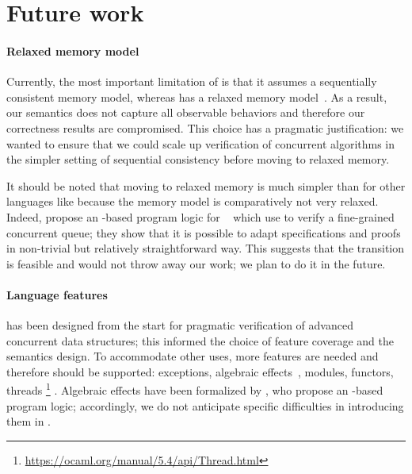 \section{Future work}

\paragraph{Relaxed memory model}

Currently, the most important limitation of \ZooLang is that it assumes a sequentially consistent memory model, whereas \OCamlFive has a relaxed memory model~\citep*{DBLP:conf/pldi/DolanSM18}.
As a result, our semantics does not capture all observable behaviors and therefore our correctness results are compromised.
This choice has a pragmatic justification: we wanted to ensure that we could scale up verification of concurrent algorithms in the simpler setting of sequential consistency before moving to relaxed memory.

It should be noted that moving to relaxed memory is much simpler than for other languages like \C because the \OCamlFive memory model is comparatively not very relaxed.
Indeed, \citet*{DBLP:journals/pacmpl/MevelJP20} propose an \Iris-based program logic for \MulticoreOCaml~\citep*{DBLP:journals/pacmpl/Sivaramakrishnan20} which \citet*{DBLP:journals/pacmpl/MevelJ21} use to verify a fine-grained concurrent queue; they show that it is possible to adapt specifications and proofs in non-trivial but relatively straightforward way.
This suggests that the transition is feasible and would not throw away our work; we plan to do it in the future.

\paragraph{Language features}

\ZooLang has been designed from the start for pragmatic verification of advanced concurrent data structures; this informed the choice of feature coverage and the semantics design.
To accommodate other uses, more features are needed and therefore should be supported: exceptions, algebraic effects~\citep*{DBLP:conf/pldi/Sivaramakrishnan21}, modules, functors, threads%
\footnote{
\url{https://ocaml.org/manual/5.4/api/Thread.html}
}%
.
Algebraic effects have been formalized by \citet*{DBLP:journals/pacmpl/VilhenaP21}, who propose an \Iris-based program logic; accordingly, we do not anticipate specific difficulties in introducing them in \ZooLang.

